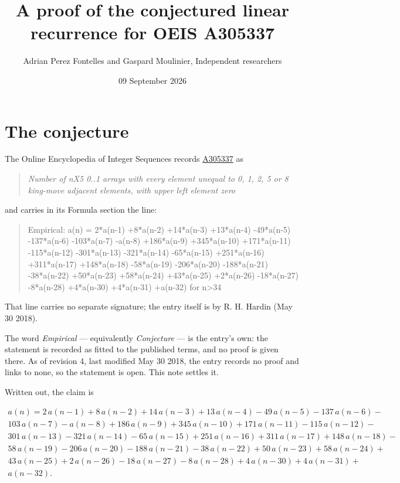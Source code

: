 \documentclass[11pt]{article}
\title{A proof of the conjectured linear recurrence for OEIS A305337}
\author{Adrian Perez Fontelles and Gaspard Moulinier, Independent researchers}
\date{09 September 2026}
\theoremstyle{definition}
\begin{document}
\maketitle
\section{The conjecture}

The Online Encyclopedia of Integer Sequences records \href{https://oeis.org/A305337}{A305337} as

\begin{quote}\itshape Number of nX5 0..1 arrays with every element unequal to 0, 1, 2, 5 or 8 king-move adjacent elements, with upper left element zero\end{quote}

and carries in its Formula section the line:

\begin{quote}\ttfamily Empirical: a(n) = 2*a(n-1) +8*a(n-2) +14*a(n-3) +13*a(n-4) -49*a(n-5) -137*a(n-6) -103*a(n-7) -a(n-8) +186*a(n-9) +345*a(n-10) +171*a(n-11) -115*a(n-12) -301*a(n-13) -321*a(n-14) -65*a(n-15) +251*a(n-16) +311*a(n-17) +148*a(n-18) -58*a(n-19) -206*a(n-20) -188*a(n-21) -38*a(n-22) +50*a(n-23) +58*a(n-24) +43*a(n-25) +2*a(n-26) -18*a(n-27) -8*a(n-28) +4*a(n-30) +4*a(n-31) +a(n-32) for n>34\end{quote}

That line carries no separate signature; the entry itself is by R. H. Hardin (May 30 2018).

The word {\itshape Empirical} --- equivalently {\itshape Conjecture} --- is the entry's own: the statement is recorded as fitted to the published terms, and no proof is given there. As of revision 4, last modified May 30 2018, the entry records no proof and links to none, so the statement is open. This note settles it.

Written out, the claim is

\begin{multline*} a(n) = 2\,a(n-1) + 8\,a(n-2) + 14\,a(n-3) + 13\,a(n-4) - 49\,a(n-5) - 137\,a(n-6) - \\ 103\,a(n-7) - a(n-8) + 186\,a(n-9) + 345\,a(n-10) + 171\,a(n-11) - 115\,a(n-12) - \\ 301\,a(n-13) - 321\,a(n-14) - 65\,a(n-15) + 251\,a(n-16) + 311\,a(n-17) + 148\,a(n-18) - \\ 58\,a(n-19) - 206\,a(n-20) - 188\,a(n-21) - 38\,a(n-22) + 50\,a(n-23) + 58\,a(n-24) + \\ 43\,a(n-25) + 2\,a(n-26) - 18\,a(n-27) - 8\,a(n-28) + 4\,a(n-30) + 4\,a(n-31) + \\ a(n-32). \end{multline*}
\end{document}
